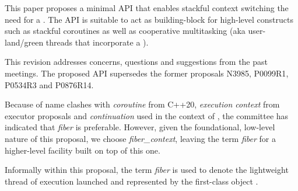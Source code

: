 \label{abstract}

This paper proposes a
minimal API that enables stackful context switching  the need for a
. The API is suitable to act as building-block for high-level
constructs such as stackful coroutines as well as cooperative multitasking
(aka user-land/green threads that incorporate a ).

This revision addresses concerns, questions and suggestions from the past meetings.
The proposed API supersedes the former proposals N3985\cite{N3985},
P0099R1\cite{P0099R1}, P0534R3\cite{P0534R3} and P0876R14\cite{P0876R14}.

Because of name clashes with \emph{coroutine} from C++20,
\emph{execution context} from executor proposals and \emph{continuation} used
in the context of , the committee has indicated
that \emph{fiber} is preferable. However, given the foundational, low-level
nature of this proposal, we choose \emph{fiber\_context}, leaving the
term \emph{fiber} for a higher-level facility built on top of this one.

Informally within this proposal, the term \emph{fiber} is used to denote the
lightweight thread of execution launched and represented by the first-class
object \fiber.
